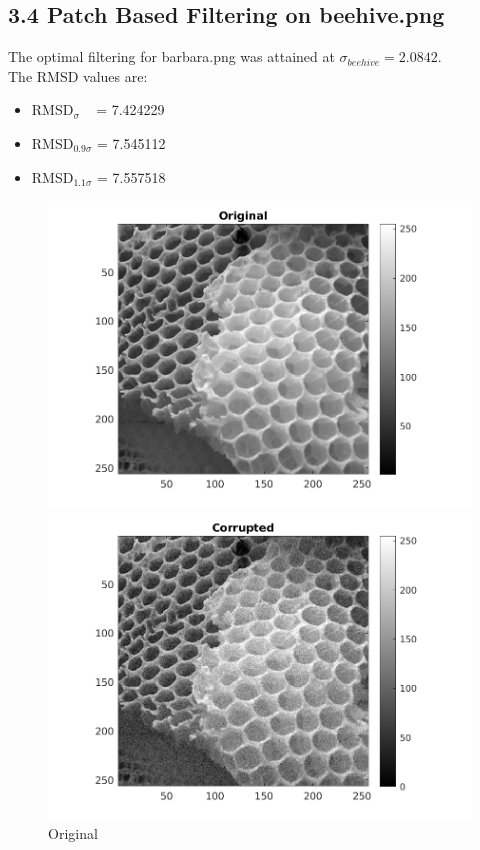 \documentclass[12pt, a4paper]{article}
\begin{document}
\subsection*{3.4 Patch Based Filtering on beehive.png}
\noindent The optimal filtering for barbara.png was attained at $\sigma_{beehive} = 2.0842$. \\
The RMSD values are:
\begin{itemize}
	\item RMSD$_{\sigma}\;\;\;$  = 7.424229
	\item RMSD$_{0.9\sigma}$ = 7.545112
	\item RMSD$_{1.1\sigma}$ = 7.557518
\end{itemize}
\begin{figure}[h]
    \centering
    \renewcommand{\thefigure}{3.4(a)}
    \begin{minipage}[c][1\width]{0.3\textwidth}
    	\hspace*{-1in}
    	\includegraphics[width=1.5\textwidth]{Honeycomb_original.png}
    	\caption{Original}
	    \label{fig:3.4(a)}
    \end{minipage}
    \renewcommand{\thefigure}{3.4(b)}
    \begin{minipage}[c][1\width]{0.3\textwidth}
    	\hspace*{-0.5in}
    	\includegraphics[width=1.5\textwidth]{Honeycomb_corrupted.png}

\end{minipage}
\end{figure}
\end{document}
